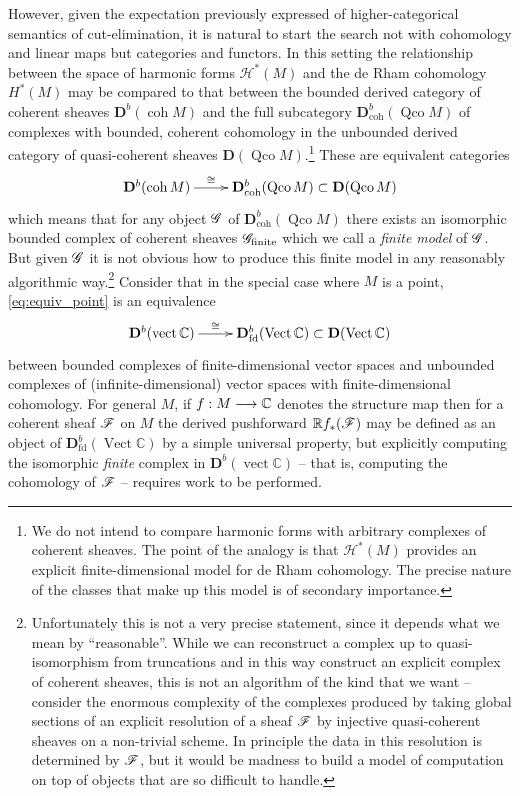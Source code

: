 \documentclass[english,letter paper,12pt,reqno]{article}
\theoremstyle{example}
\numberwithin{equation}{section}
\begin{document}
However, given the expectation previously expressed of higher-categorical semantics of cut-elimination, it is natural to start the search not with cohomology and linear maps but categories and functors. In this setting the relationship between the space of harmonic forms $\mathscr{H}^*(M)$ and the de Rham cohomology $H^*(M)$ may be compared to that between the bounded derived category of coherent sheaves $\mathbf{D}^b(\operatorname{coh} M)$ and the full subcategory $\mathbf{D}^b_{\operatorname{coh}}(\operatorname{Qco} M)$ of complexes with bounded, coherent cohomology in the unbounded derived category of quasi-coherent sheaves $\mathbf{D}(\operatorname{Qco} M)$.\footnote{We do not intend to compare harmonic forms with arbitrary complexes of coherent sheaves. The point of the analogy is that $\mathscr{H}^*(M)$ provides an explicit finite-dimensional model for de Rham cohomology. The precise nature of the classes that make up this model is of secondary importance.} These are equivalent categories
\begin{equation}\label{eq:equiv_point}
\xymatrix{
\mathbf{D}^b(\operatorname{coh} M) \ar[r]^-{\cong} & \mathbf{D}^b_{\operatorname{coh}}(\operatorname{Qco} M) \subset \mathbf{D}(\operatorname{Qco} M)
}
\end{equation}
which means that for any object $\mathscr{G}$ of $\mathbf{D}^b_{\operatorname{coh}}(\operatorname{Qco} M)$ there exists an isomorphic bounded complex of coherent sheaves $\mathscr{G}_{\operatorname{finite}}$ which we call a \emph{finite model} of $\mathscr{G}$. But given $\mathscr{G}$ it is not obvious how to produce this finite model in any reasonably algorithmic way.\footnote{Unfortunately this is not a very precise statement, since it depends what we mean by ``reasonable''. While we can reconstruct a complex up to quasi-isomorphism from truncations and in this way construct an explicit complex of coherent sheaves, this is not an algorithm of the kind that we want -- consider the enormous complexity of the complexes produced by taking global sections of an explicit resolution of a sheaf $\mathscr{F}$ by injective quasi-coherent sheaves on a non-trivial scheme. In principle the data in this resolution is determined by $\mathscr{F}$, but it would be madness to build a model of computation on top of objects that are so difficult to handle.} Consider that in the special case where $M$ is a point, \eqref{eq:equiv_point} is an equivalence
\[
\xymatrix{
\mathbf{D}^b(\operatorname{vect} \mathbb{C}) \ar[r]^-{\cong} & \mathbf{D}^b_{\operatorname{fd}}(\operatorname{Vect} \mathbb{C}) \subset \mathbf{D}(\operatorname{Vect} \mathbb{C})
}
\]
between bounded complexes of finite-dimensional vector spaces and unbounded complexes of (infinite-dimensional) vector spaces with finite-dimensional cohomology. For general $M$, if $f: M \longrightarrow \mathbb{C}$ denotes the structure map then for a coherent sheaf $\mathscr{F}$ on $M$ the derived pushforward $\mathbb{R} f_*( \mathscr{F} )$ may be defined as an object of $\mathbf{D}^b_{\operatorname{fd}}(\operatorname{Vect} \mathbb{C})$ by a simple universal property, but explicitly computing the isomorphic \emph{finite} complex in $\mathbf{D}^b(\operatorname{vect} \mathbb{C})$ -- that is, computing the cohomology of $\mathscr{F}$ -- requires work to be performed. %
\end{document}
